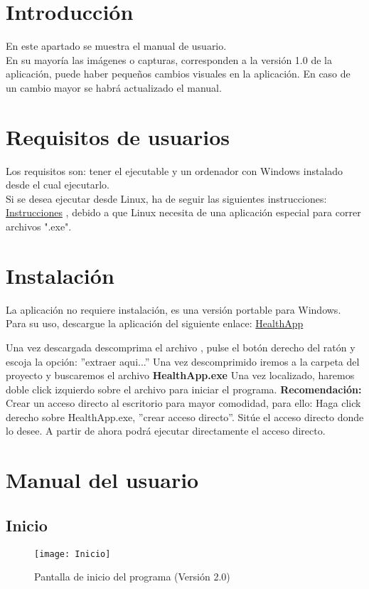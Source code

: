 
\section{Introducción}
En este apartado se muestra el manual de usuario.\\
En su mayoría las imágenes o capturas, corresponden a la versión 1.0 de la aplicación, puede haber pequeños cambios visuales en la aplicación. En caso de un cambio mayor se habrá actualizado el manual.
\section{Requisitos de usuarios}
Los requisitos son: tener el ejecutable y un ordenador con Windows instalado desde el cual ejecutarlo.\\ 
Si se desea ejecutar desde Linux, ha de seguir las siguientes instrucciones: \href{https://techlandia.com/ejecutar-archivos-exe-linux-como_42146/}{Instrucciones} , debido a que Linux necesita de una aplicación especial para correr archivos ".exe".
\section{Instalación}
La aplicación no requiere instalación, es una versión portable para Windows. Para su uso, descargue la aplicación del siguiente enlace: \href{https://www.dropbox.com/s/mza7a1kobm9mlcr/HealthApp.zip?dl=0}{HealthApp}

Una vez descargada descomprima el archivo , pulse el botón derecho del ratón y escoja la opción: ''extraer aqui...''
Una vez descomprimido iremos a la carpeta del proyecto y buscaremos el archivo \textbf{HealthApp.exe}
Una vez localizado, haremos doble click izquierdo sobre el archivo para iniciar el programa. \textbf{Recomendación:} Crear un acceso directo al escritorio para mayor comodidad, para ello: Haga click derecho sobre HealthApp.exe, ''crear acceso directo''. Sitúe el acceso directo donde lo desee. A partir de ahora podrá ejecutar directamente el acceso directo.

\section{Manual del usuario}
\subsection{Inicio}
\begin{figure}[htb]
\centering
\texttt{[image: Inicio]} 
\caption{Pantalla de inicio del programa (Versión 2.0)}
\end{figure}
